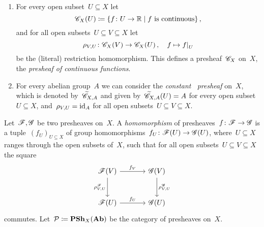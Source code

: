 \begin{example}
\begin{enumerate}
      \begin{examplenonum}
        \leavevmode
        \begin{enumerate}
          \item
            For every open subset~$U \subseteq X$ let
            \[
                        \cont_X(U)
              \defined  \{
                          f \colon U \to \Real
                        \suchthat
                          \text{$f$ is continuous}
                        \} \,,
            \]
            and for all open subsets~$U \subseteq V \subseteq X$ let
            \[
                      \rho_{V,U}
              \colon  \cont_X(V)
              \to     \cont_X(U) \,,
              \quad   f
              \mapsto \restrict{f}{U}
            \]
            be the (literal) restriction homomorphism.
            This defines a presheaf~$\mathscr{C}_X$ on~$X$, the \emph{presheaf of continuous functions}.
          \item
            For every abelian group~$A$ we can consider the \emph{constant~ presheaf} on~$X$, which is denoted by~$\widetilde{\mathscr{C}}_{X,A}$ and given by~$\widetilde{\mathscr{C}}_{X,A}(U) = A$ for every open subset~$U \subseteq X$, and~$\rho_{V,U} = \operatorname{id}_A$ for all open subsets~$U \subseteq V \subseteq X$.
        \end{enumerate}
      \end{examplenonum}
      
      Let~$\mathscr{F}, \mathscr{G}$ be two presheaves on~$X$.
      A \emph{homomorphism} of presheaves~$f \colon \mathscr{F} \to \mathscr{G}$ is a tuple~$(f_U)_{U \subseteq X}$ of group homomorphisms~$f_U \colon \mathscr{F}(U) \to \mathscr{G}(U)$, where~$U \subseteq X$ ranges through the open subsets of~$X$, such that for all open subsets~$U \subseteq V \subseteq X$ the square
      \[
        \begin{tikzcd}[sep = large]
            \sheaf{F}(V)
            \arrow{r}[above]{f_V}
            \arrow{d}[left]{\rho_{V,U}^\sheaf{F}}
          & \sheaf{G}(V)
            \arrow{d}[right]{\rho_{V,U}^\sheaf{G}}
          \\
            \sheaf{F}(U)
            \arrow{r}[above]{f_U}
          & \sheaf{G}(U)
        \end{tikzcd}
      \]
      commutes.
      Let~$\mathcal{P} \coloneqq \mathbf{PSh}_X(\mathbf{Ab})$ be the category of presheaves on~$X$.
      

\end{enumerate}
\end{example}

